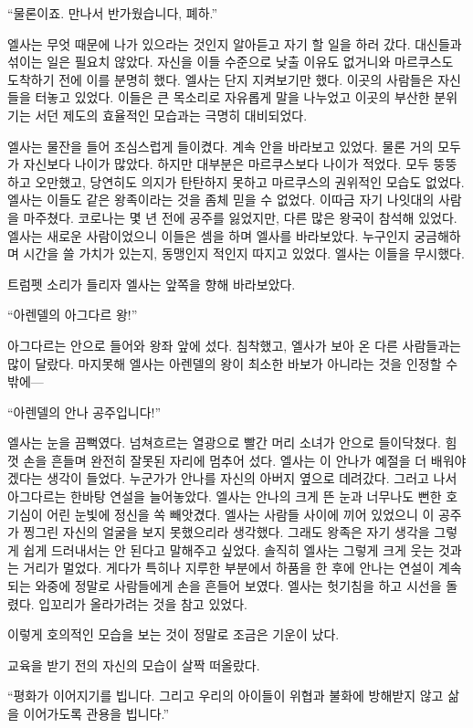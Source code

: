 ``물론이죠. 만나서 반가웠습니다, 폐하.''

엘사는 무엇 때문에 나가 있으라는 것인지 알아듣고 자기 할 일을 하러 갔다. 대신들과 섞이는 일은 필요치 않았다. 자신을 이들 수준으로 낮출 이유도 없거니와 마르쿠스도 도착하기 전에 이를 분명히 했다. 엘사는 단지 지켜보기만 했다. 이곳의 사람들은 자신들을 터놓고 있었다. 이들은 큰 목소리로 자유롭게 말을 나누었고 이곳의 부산한 분위기는 서던 제도의 효율적인 모습과는 극명히 대비되었다.

엘사는 물잔을 들어 조심스럽게 들이켰다. 계속 안을 바라보고 있었다. 물론 거의 모두가 자신보다 나이가 많았다. 하지만 대부분은 마르쿠스보다 나이가 적었다. 모두 뚱뚱하고 오만했고, 당연히도 의지가 탄탄하지 못하고 마르쿠스의 권위적인 모습도 없었다. 엘사는 이들도 같은 왕족이라는 것을 좀체 믿을 수 없었다. 이따금 자기 나잇대의 사람을 마주쳤다. 코로나는 몇 년 전에 공주를 잃었지만, 다른 많은 왕국이 참석해 있었다. 엘사는 새로운 사람이었으니 이들은 셈을 하며 엘사를 바라보았다. 누구인지 궁금해하며 시간을 쓸 가치가 있는지, 동맹인지 적인지 따지고 있었다. 엘사는 이들을 무시했다.

트럼펫 소리가 들리자 엘사는 앞쪽을 향해 바라보았다.

``아렌델의 아그다르 왕!''

아그다르는 안으로 들어와 왕좌 앞에 섰다. 침착했고, 엘사가 보아 온 다른 사람들과는 많이 달랐다. 마지못해 엘사는 아렌델의 왕이 최소한 바보가 아니라는 것을 인정할 수밖에—

``아렌델의 안나 공주입니다!''

엘사는 눈을 끔뻑였다. 넘쳐흐르는 열광으로 빨간 머리 소녀가 안으로 들이닥쳤다. 힘껏 손을 흔들며 완전히 잘못된 자리에 멈추어 섰다. 엘사는 이 안나가 예절을 더 배워야겠다는 생각이 들었다. 누군가가 안나를 자신의 아버지 옆으로 데려갔다. 그러고 나서 아그다르는 한바탕 연설을 늘어놓았다. 엘사는 안나의 크게 뜬 눈과 너무나도 뻔한 호기심이 어린 눈빛에 정신을 쏙 빼앗겼다. 엘사는 사람들 사이에 끼어 있었으니 이 공주가 찡그린 자신의 얼굴을 보지 못했으리라 생각했다. 그래도 왕족은 자기 생각을 그렇게 쉽게 드러내서는 안 된다고 말해주고 싶었다. 솔직히 엘사는 그렇게 크게 웃는 것과는 거리가 멀었다. 게다가 특히나 지루한 부분에서 하품을 한 후에 안나는 연설이 계속되는 와중에 정말로 사람들에게 손을 흔들어 보였다. 엘사는 헛기침을 하고 시선을 돌렸다. 입꼬리가 올라가려는 것을 참고 있었다.

이렇게 호의적인 모습을 보는 것이 정말로 조금은 기운이 났다.

교육을 받기 전의 자신의 모습이 살짝 떠올랐다.

`` 평화가 이어지기를 빕니다. 그리고 우리의 아이들이 위협과 불화에 방해받지 않고 삶을 이어가도록 관용을 빕니다.''

